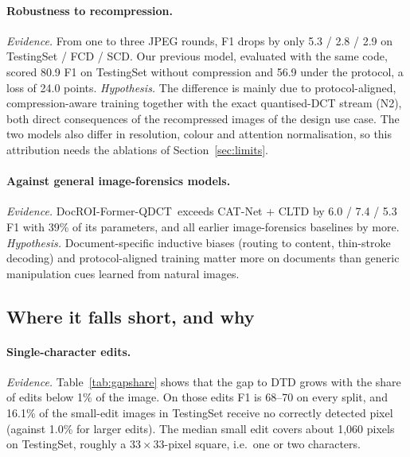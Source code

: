 \documentclass[11pt,a4paper]{article}
\newcommand{\ours}{DocROI-Former-QDCT}
\begin{document}
\paragraph{Robustness to recompression.}
\emph{Evidence.} From one to three JPEG rounds, F1 drops by only 5.3 / 2.8 / 2.9 on TestingSet /
FCD / SCD. Our previous model, evaluated with the same code, scored 80.9 F1 on TestingSet without
compression and 56.9 under the protocol, a loss of 24.0 points.
\emph{Hypothesis.} The difference is mainly due to protocol-aligned, compression-aware training
together with the exact quantised-DCT stream (N2), both direct consequences of the recompressed
images of the design use case. The two models also differ in resolution, colour and attention
normalisation, so this attribution needs the ablations of Section~\ref{sec:limits}.

\paragraph{Against general image-forensics models.}
\emph{Evidence.} \ours\ exceeds CAT-Net + CLTD by 6.0 / 7.4 / 5.3 F1 with 39\% of its parameters,
and all earlier image-forensics baselines by more. \emph{Hypothesis.} Document-specific inductive
biases (routing to content, thin-stroke decoding) and protocol-aligned training matter more on
documents than generic manipulation cues learned from natural images.

\subsection{Where it falls short, and why}

\paragraph{Single-character edits.}
\emph{Evidence.} Table~\ref{tab:gapshare} shows that the gap to DTD grows with the share of edits
below 1\% of the image. On those edits F1 is 68--70 on every split, and 16.1\% of the
small-edit images in TestingSet receive no correctly detected pixel (against 1.0\% for larger
edits). The median small edit covers about 1{,}060 pixels on TestingSet, roughly a
$33\times33$-pixel square, i.e.\ one or two characters.
\end{document}

